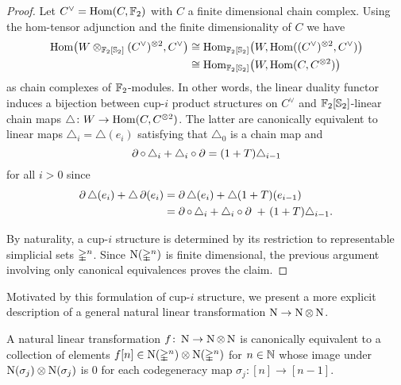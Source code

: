 \begin{proof}
	Let $C^\vee = \mathrm{Hom}(C, {\mathbb{F}_2})$ with $C$ a finite dimensional chain complex.
	Using the hom-tensor adjunction and the finite dimensionality of $C$ we have
	\begin{align*}
	\mathrm{Hom} \big(W \otimes_{{\mathbb{F}_2}[\mathbb{S}_2]} (C^\vee)^{\otimes 2}, C^\vee \big) & \cong
	\mathrm{Hom}_{{\mathbb{F}_2}[\mathbb{S}_2]} \big( W, \mathrm{Hom}((C^\vee)^{\otimes 2}, C^\vee) \big) \\ & \cong
	\mathrm{Hom}_{{\mathbb{F}_2}[\mathbb{S}_2]} \big( W, \mathrm{Hom}(C, C^{\otimes 2}) \big)
	\end{align*}
	as chain complexes of ${\mathbb{F}_2}$-modules.
	In other words, the linear duality functor induces a bijection between cup-$i$ product structures on $C^\vee$ and ${\mathbb{F}_2}[\mathbb{S}_2]$-linear chain maps $\triangle \colon W \to \mathrm{Hom}(C, C^{\otimes 2})$.
	The latter are canonically equivalent to linear maps $\triangle_i = \triangle(e_i)$ satisfying that $\triangle_0$ is a chain map and
	\[
	\operatorname{\partial} \circ \, \triangle_i + \triangle_i \circ \operatorname{\partial} =
	(1+T) \triangle_{i-1}
	\]
	for all $i > 0$ since
	\begin{align*}
	\operatorname{\partial} \triangle (e_i) + \triangle \operatorname{\partial}(e_i) &=
	\operatorname{\partial} \triangle (e_i) + \triangle (1+T) (e_{i-1}) \\ &=
	\operatorname{\partial} \circ \, \triangle_i + \triangle_i \circ \operatorname{\partial} \ +\ (1+T) \triangle_{i-1}.
	\end{align*}

	By naturality, a cup-$i$ structure is determined by its restriction to representable simplicial sets $\mathbb{\Delta}^n$.
	Since $\operatorname{N}(\mathbb{\Delta}^n)$ is finite dimensional, the previous argument involving only canonical equivalences proves the claim.
\end{proof}

Motivated by this formulation of cup-$i$ structure, we present a more explicit description of a general natural linear transformation $\operatorname{N} \to \operatorname{N} \otimes \operatorname{N}$.

\begin{lemma} \label{l:natural linear map}
	A natural linear transformation $f \colon \operatorname{N} \to \operatorname{N} \otimes \operatorname{N}$ is canonically equivalent to a collection of elements $f[n] \in \operatorname{N}(\mathbb{\Delta}^n) \otimes \operatorname{N}(\mathbb{\Delta}^n)$
	for $n \in \mathbb{N}$ whose image under $\operatorname{N}(\sigma_j) \otimes \operatorname{N}(\sigma_j)$ is $0$
	for each codegeneracy map $\sigma_j \colon [n] \to [n-1]$.
\end{lemma}

